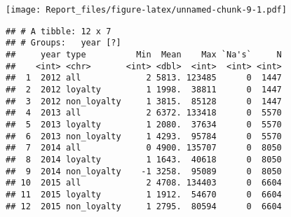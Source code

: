 \documentclass[]{article}
\newenvironment{Shaded}{\begin{snugshade}}{\end{snugshade}}
\newcommand{\KeywordTok}[1]{\textcolor[rgb]{0.13,0.29,0.53}{\textbf{#1}}}
\newcommand{\DataTypeTok}[1]{\textcolor[rgb]{0.13,0.29,0.53}{#1}}
\newcommand{\DecValTok}[1]{\textcolor[rgb]{0.00,0.00,0.81}{#1}}
\newcommand{\FloatTok}[1]{\textcolor[rgb]{0.00,0.00,0.81}{#1}}
\newcommand{\StringTok}[1]{\textcolor[rgb]{0.31,0.60,0.02}{#1}}
\newcommand{\OperatorTok}[1]{\textcolor[rgb]{0.81,0.36,0.00}{\textbf{#1}}}
\newcommand{\NormalTok}[1]{#1}
\begin{document}
\begin{Shaded}
\end{Shaded}

\texttt{[image: Report\_files/figure-latex/unnamed-chunk-9-1.pdf]}

\begin{Shaded}
\end{Shaded}

\begin{verbatim}
## # A tibble: 12 x 7
## # Groups:   year [?]
##     year type          Min  Mean    Max `Na's`     N
##    <int> <chr>       <int> <dbl>  <int>  <int> <int>
##  1  2012 all             2 5813. 123485      0  1447
##  2  2012 loyalty         1 1998.  38811      0  1447
##  3  2012 non_loyalty     1 3815.  85128      0  1447
##  4  2013 all             2 6372. 133418      0  5570
##  5  2013 loyalty         1 2080.  37634      0  5570
##  6  2013 non_loyalty     1 4293.  95784      0  5570
##  7  2014 all             0 4900. 135707      0  8050
##  8  2014 loyalty         1 1643.  40618      0  8050
##  9  2014 non_loyalty    -1 3258.  95089      0  8050
## 10  2015 all             2 4708. 134403      0  6604
## 11  2015 loyalty         1 1912.  54670      0  6604
## 12  2015 non_loyalty     1 2795.  80594      0  6604
\end{verbatim}
\end{document}
